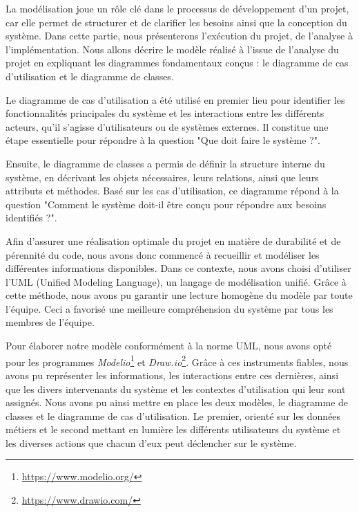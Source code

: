 La modélisation joue un rôle clé dans le processus de développement d'un projet, car elle permet de structurer et de clarifier les besoins ainsi que la conception du système. Dans cette partie, nous présenterons l'exécution du projet, de l'analyse à l'implémentation. Nous allons décrire le modèle réalisé à l'issue de l'analyse du projet en expliquant les diagrammes fondamentaux conçus : le diagramme de cas d'utilisation et le diagramme de classes.

\vspace{0.35cm}

Le diagramme de cas d'utilisation a été utilisé en premier lieu pour identifier les fonctionnalités principales du système et les interactions entre les différents acteurs, qu'il s'agisse d'utilisateurs ou de systèmes externes. Il constitue une étape essentielle pour répondre à la question "Que doit faire le système ?".

\vspace{0.35cm}

Ensuite, le diagramme de classes a permis de définir la structure interne du système, en décrivant les objets nécessaires, leurs relations, ainsi que leurs attributs et méthodes. Basé sur les cas d'utilisation, ce diagramme répond à la question "Comment le système doit-il être conçu pour répondre aux besoins identifiés ?".

\vspace{0.35cm}

Afin d'assurer une réalisation optimale du projet en matière de durabilité et de pérennité du code, nous avons donc commencé à recueillir et modéliser les différentes informations disponibles. Dans ce contexte, nous avons choisi d'utiliser l'UML (Unified Modeling Language), un langage de modélisation unifié. Grâce à cette méthode, nous avons pu garantir une lecture homogène du modèle par toute l'équipe. Ceci a favorisé une meilleure compréhension du système par tous les membres de l'équipe. 

\vspace{0.35cm}

Pour élaborer notre modèle conformément à la norme UML, nous avons opté pour les programmes \textit{Modelio}\footnote{\url{https://www.modelio.org/}} et \textit{Draw.io}\footnote{\url{https://www.drawio.com/}}. Grâce à ces instruments fiables, nous avons pu représenter les informations, les interactions entre ces dernières, ainsi que les divers intervenants du système et les contextes d'utilisation qui leur sont assignés. Nous avons pu ainsi mettre en place les deux modèles, le diagramme de classes et le diagramme de cas d'utilisation. Le premier, orienté sur les données métiers et le second mettant en lumière les différents utilisateurs du système et les diverses actions que chacun d'eux peut déclencher sur le système.

